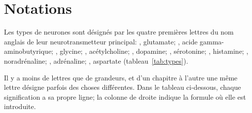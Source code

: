\chapter{Notations}
\label{sec:notation}

Les types de neurones sont désignés par les quatre premières lettres du nom anglais de leur neurotransmetteur principal: , glutamate; , acide gamma-aminobutyrique; , glycine; , acétylcholine; , dopamine; , sérotonine; , histamine; , noradrénaline; , adrénaline; , aspartate (tableau~\ref{tab:types}).

Il y a moins de lettres que de grandeurs, et d'un chapitre à l'autre une même lettre désigne parfois des choses différentes. Dans le tableau ci-dessous, chaque signification a sa propre ligne; la colonne de droite indique la formule où elle est introduite.


